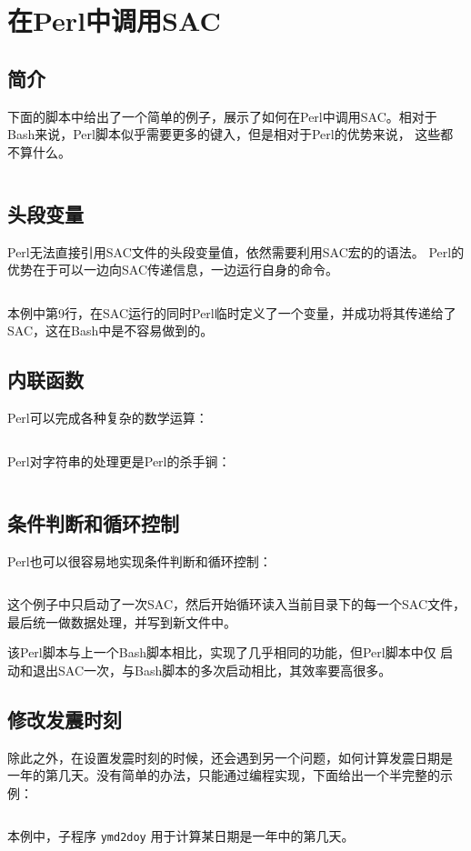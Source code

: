 \section{在Perl中调用SAC}
\label{sec:sac-perl}

\subsection{简介}
下面的脚本中给出了一个简单的例子，展示了如何在Perl中调用SAC。相对于
Bash来说，Perl脚本似乎需要更多的键入，但是相对于Perl的优势来说，
这些都不算什么。
\inputminted{perl}{./call-in-script/simple-script.pl}

\subsection{头段变量}
Perl无法直接引用SAC文件的头段变量值，依然需要利用SAC宏的的语法。
Perl的优势在于可以一边向SAC传递信息，一边运行自身的命令。
\inputminted{perl}{./call-in-script/variables.pl}
本例中第9行，在SAC运行的同时Perl临时定义了一个变量，并成功将其传递给了
SAC，这在Bash中是不容易做到的。

\subsection{内联函数}
Perl可以完成各种复杂的数学运算：
\inputminted{perl}{./call-in-script/arithmetic-functions.pl}

Perl对字符串的处理更是Perl的杀手锏：
\inputminted{perl}{./call-in-script/string-functions.pl}

\subsection{条件判断和循环控制}
Perl也可以很容易地实现条件判断和循环控制：
\inputminted{perl}{./call-in-script/do-loops.pl}
这个例子中只启动了一次SAC，然后开始循环读入当前目录下的每一个SAC文件，
最后统一做数据处理，并写到新文件中。

该Perl脚本与上一个Bash脚本相比，实现了几乎相同的功能，但Perl脚本中仅
启动和退出SAC一次，与Bash脚本的多次启动相比，其效率要高很多。

\subsection{修改发震时刻}
\label{subsec:ch-origin-perl}
除此之外，在设置发震时刻的时候，还会遇到另一个问题，如何计算发震日期是
一年的第几天。没有简单的办法，只能通过编程实现，下面给出一个半完整的示例：
\inputminted{perl}{./call-in-script/ch-origin.pl}
本例中，子程序 \texttt{ymd2doy} 用于计算某日期是一年中的第几天。

